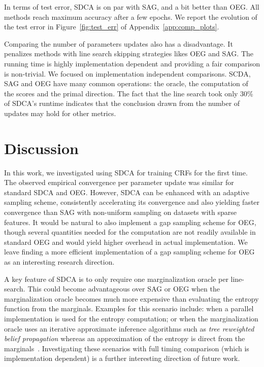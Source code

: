 In terms of test error, SDCA is on par with SAG, and a bit better than OEG.
All methods reach maximum accuracy after a few epochs.
We report the evolution of the test error in Figure~\ref{fig:test_err} of Appendix~\ref{app:comp_plots}.

Comparing the number of parameters updates also has a disadvantage.
It penalizes methods with line search skipping strategies likes OEG and SAG.
The running time is highly implementation dependent and providing a fair comparison is non-trivial.
We focused on implementation independent comparisons.
SCDA, SAG and OEG have many common operations: the oracle, the computation of the scores and the primal  direction.
The fact that the line search took only 30\% of SDCA's runtime indicates that the conclusion drawn from the number of updates may hold for other metrics.

\section{Discussion} \label{sec:discussion}

In this work, we investigated using SDCA for training CRFs for the first time.
The observed empirical convergence per parameter update was similar for standard SDCA and OEG.
However, SDCA can be enhanced with an adaptive sampling scheme, consistently accelerating its convergence and also yielding faster convergence than SAG with non-uniform sampling on datasets with sparse features.
It would be natural to also implement a gap sampling scheme for OEG, though several quantities needed for the computation are not readily available in standard OEG and would yield higher overhead in actual implementation.
We leave finding a more efficient implementation of a gap sampling scheme for OEG as an interesting research direction.

A key feature of SDCA is to only require one marginalization oracle per line-search.
This could become advantageous over SAG or OEG when the marginalization oracle becomes much more expensive than evaluating the entropy function from the marginals.
Examples for this scenario include: when a parallel implementation is used for the entropy computation; or when the marginalization oracle uses an iterative approximate inference algorithms such as \emph{tree reweighted belief propagation} whereas an approximation of the entropy is direct from the marginals~\citep{kirshnan15barrierFW}.
Investigating these scenarios with full timing comparison (which is implementation dependent) is a further interesting direction of future work.

